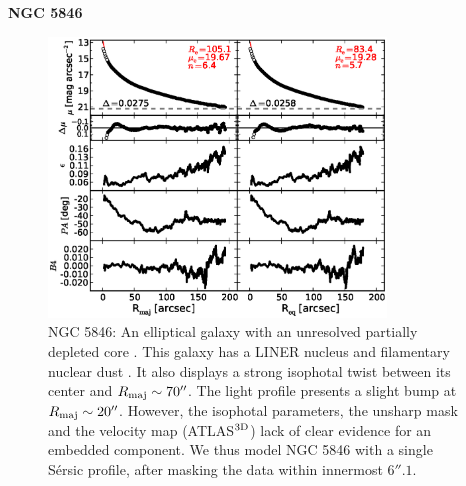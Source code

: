\documentclass[preprint2]{emulateapj}
\newcommand{\fitfigurewidth}{0.8\textwidth}
\begin{document}
  \clearpage\newpage\noindent
  {\bf NGC 5846 \\}

  \begin{figure}[h]
  \begin{center}
  \includegraphics[width=\fitfigurewidth]{n5846_1Dfit.eps}
  \caption{NGC 5846: 
  An elliptical galaxy with an unresolved partially depleted core \citep{rusli2013}. %
  This galaxy has a LINER nucleus \citep{carrillo1999} and filamentary nuclear dust \citep{tran2001}.
  It also displays a strong isophotal twist between its center and $R_{\rm maj} \sim 70''$.
  The light profile presents a slight bump at $R_{\rm maj} \sim 20''$.
  However, the isophotal parameters, the unsharp mask and the velocity map (ATLAS$^{\rm 3D}$) lack of clear evidence for an embedded component.
  We thus model NGC 5846 with a single S\'ersic profile, after masking the data within innermost $6''.1$.
  }
  \end{center}
  \end{figure}
\end{document}
